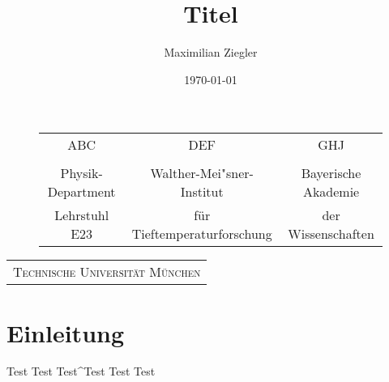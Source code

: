 \documentclass[a4paper, 10pt]{scrreprt}
\author{Maximilian Ziegler}
\title{Titel}
\date{\today}
\begin{document}
\begin{titlepage}
\clearpage \thispagestyle{empty} \setcounter{page}{0}

\begin{center}
\begin{figure}[h]
\centering
\begin{tabular}{ccc}
        ABC	&	DEF	&	GHJ \\
        &&\\
    \large{Physik-Department}&
    \large{Walther-Mei"sner-Institut}&
    \large{Bayerische Akademie}\\
    \large{Lehrstuhl E23}&
    \large{für Tieftemperaturforschung}&
    \large{der Wissenschaften}
\end{tabular}
\end{figure}
\vspace{1.5cm}

%



%
\begin{tabular}{c}

    \textsc{\Large{Technische Universität München}}%
\end{tabular}
\end{center}
\end{titlepage}
%
\clearpage \thispagestyle{empty} \setcounter{page}{0}
\newpage \thispagestyle{empty}
\tableofcontents
\newpage

\chapter{Einleitung}
\label{cha:Einleitung}




Test Test Test^Test Test Test
\end{document}
